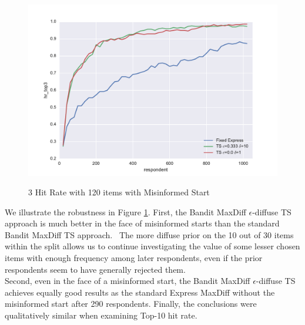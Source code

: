 \documentclass[mksc,blindrev]{informs3} %
\begin{document}
\begin{figure}
\caption{3 Hit Rate with 120 items with Misinformed Start}
\includegraphics[width=1\textwidth]{plots/3hitrate120show3.pdf}
\label{fig:3hitmis}
\end{figure}
We illustrate the robustness in Figure \ref{fig:3hitmis}. First, the Bandit MaxDiff $\epsilon$-diffuse TS approach is much better in the face of misinformed starts than the standard Bandit MaxDiff TS approach.  The more diffuse prior on the 10 out of 30 items within the split allows us to continue investigating the value of some lesser chosen items with enough frequency among later respondents, even if the prior respondents seem to have generally rejected them.\\
Second, even in the face of a misinformed start, the Bandit MaxDiff $\epsilon$-diffuse TS achieves equally good results as the standard Express MaxDiff without the misinformed start after 290 respondents. Finally, the conclusions were qualitatively similar when examining Top-10 hit rate.\\
\end{document}
